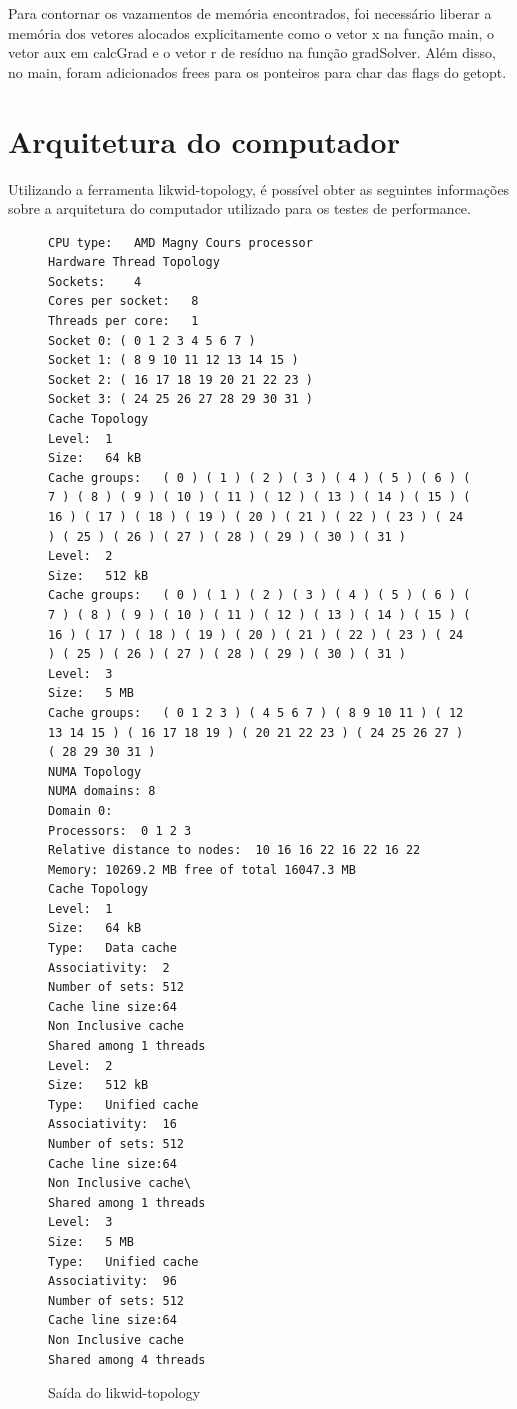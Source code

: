 \documentclass[12pt]{article}
\begin{document}
Para contornar os vazamentos de memória encontrados, foi necessário liberar a
memória dos vetores alocados explicitamente como o vetor x na função main, o
vetor aux em calcGrad e o vetor r de resíduo na função gradSolver. Além disso,
no main, foram adicionados frees para os ponteiros para char das flags do
getopt.

\section{Arquitetura do computador}\label{sec:likwid}

Utilizando a ferramenta likwid-topology, é possível obter as seguintes
informações sobre a arquitetura do computador utilizado para os testes de
performance.

\begin{figure}[ht]\footnotesize
\begin{verbatim}
CPU type:	AMD Magny Cours processor
Hardware Thread Topology
Sockets:	4 
Cores per socket:	8 
Threads per core:	1 
Socket 0: ( 0 1 2 3 4 5 6 7 )
Socket 1: ( 8 9 10 11 12 13 14 15 )
Socket 2: ( 16 17 18 19 20 21 22 23 )
Socket 3: ( 24 25 26 27 28 29 30 31 )
Cache Topology
Level:	1
Size:	64 kB
Cache groups:	( 0 ) ( 1 ) ( 2 ) ( 3 ) ( 4 ) ( 5 ) ( 6 ) ( 7 ) ( 8 ) ( 9 ) ( 10 ) ( 11 ) ( 12 ) ( 13 ) ( 14 ) ( 15 ) ( 16 ) ( 17 ) ( 18 ) ( 19 ) ( 20 ) ( 21 ) ( 22 ) ( 23 ) ( 24 ) ( 25 ) ( 26 ) ( 27 ) ( 28 ) ( 29 ) ( 30 ) ( 31 )
Level:	2
Size:	512 kB
Cache groups:	( 0 ) ( 1 ) ( 2 ) ( 3 ) ( 4 ) ( 5 ) ( 6 ) ( 7 ) ( 8 ) ( 9 ) ( 10 ) ( 11 ) ( 12 ) ( 13 ) ( 14 ) ( 15 ) ( 16 ) ( 17 ) ( 18 ) ( 19 ) ( 20 ) ( 21 ) ( 22 ) ( 23 ) ( 24 ) ( 25 ) ( 26 ) ( 27 ) ( 28 ) ( 29 ) ( 30 ) ( 31 )
Level:	3
Size:	5 MB
Cache groups:	( 0 1 2 3 ) ( 4 5 6 7 ) ( 8 9 10 11 ) ( 12 13 14 15 ) ( 16 17 18 19 ) ( 20 21 22 23 ) ( 24 25 26 27 ) ( 28 29 30 31 )
NUMA Topology
NUMA domains: 8 
Domain 0:
Processors:  0 1 2 3
Relative distance to nodes:  10 16 16 22 16 22 16 22
Memory: 10269.2 MB free of total 16047.3 MB
Cache Topology
Level:	1
Size:	64 kB
Type:	Data cache
Associativity:	2
Number of sets:	512
Cache line size:64
Non Inclusive cache
Shared among 1 threads
Level:	2
Size:	512 kB
Type:	Unified cache
Associativity:	16
Number of sets:	512
Cache line size:64
Non Inclusive cache\
Shared among 1 threads
Level:	3
Size:	5 MB
Type:	Unified cache
Associativity:	96
Number of sets:	512
Cache line size:64
Non Inclusive cache
Shared among 4 threads
\end{verbatim}\caption{Saída do likwid-topology}\label{fig:topologyOut}
\end{figure}
\end{document}
